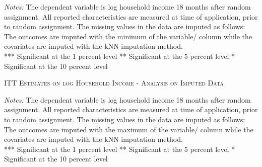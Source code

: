 \begin{appendices}
\begin{table}[t!]
\medskip
\begin{adjustbox}{width=0.825\textwidth, totalheight=\textheight, keepaspectratio}

\end{adjustbox}

\label{tab:table_kNN_min_withcontr}
\bigskip
\raggedright
\footnotesize
\textit{Notes:} The dependent variable is log household income 18 months after random assignment. All reported characteristics are measured at time of application, prior to random assignment. The missing values in the data are imputed as follows: The outcomes are imputed with the minimum of the variable/ column while the covariates are imputed with the \ac{kNN} imputation method. \\
*** Significant at the 1 percent level ** Significant at the 5 percent level * Significant at the 10 percent level
\end{table}

\begin{table}[t]
\centering
\caption{\textsc{ITT Estimates on log Household Income - Analysis on Imputed Data}}



\medskip
\begin{adjustbox}{width=0.825\textwidth, totalheight=\textheight, keepaspectratio}

\end{adjustbox}

\label{tab:table_kNN_max_withcontr}
\bigskip
\raggedright
\footnotesize
\textit{Notes:} The dependent variable is log household income 18 months after random assignment. All reported characteristics are measured at time of application, prior to random assignment. The missing values in the data are imputed as follows: The outcomes are imputed with the maximum of the variable/ column while the covariates are imputed with the \ac{kNN} imputation method. \\
*** Significant at the 1 percent level ** Significant at the 5 percent level * Significant at the 10 percent level
\end{table}



\end{appendices}
